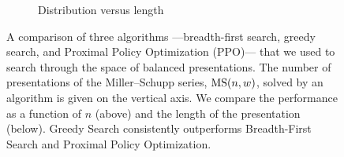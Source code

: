 \begin{figure}
\begin{subfigure}[b]{0.5\textwidth}
		\caption{Distribution versus length}
		\label{fig:performance_vs_length}
	\end{subfigure}
	\caption{A comparison of three algorithms ---breadth-first search, greedy search, and Proximal Policy Optimization (PPO)--- that we used to search through the space of balanced presentations. The number of presentations of the Miller--Schupp series, $\text{MS}(n, w)$, solved by an algorithm is given on the vertical axis. We compare the performance as a function of $n$ (above) and the length of the presentation (below). Greedy Search consistently outperforms Breadth-First Search and Proximal Policy Optimization.}
	\label{fig:performance}
\end{figure}